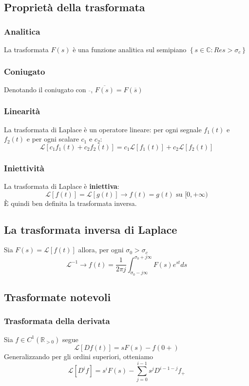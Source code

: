 \documentclass[11pt]{article}
\begin{document}
\subsection{Proprietà della trasformata}
\subsubsection{Analitica}
La trasformata $F(s)$ è una funzione analitica sul semipiano $\left\{s \in \mathbb{C}: Re s > \sigma_c\right\}$
\subsubsection{Coniugato}
Denotando il coniugato con $\overline{ }$, $\overline{F(s)} = F(\overline{s})$
\subsubsection{Linearità}
La trasformata di Laplace è un operatore lineare: per ogni segnale $f_1(t)$ e $f_2(t)$ e per ogni scalare $c_1$ e $c_2$:
\begin{displaymath}
    \mathcal{L}[c_1 f_1 (t) + c_2f_2(t)] = c_1 \mathcal{L}[f_1(t)] + c_2 \mathcal{L}[f_2(t)]
\end{displaymath}
\subsubsection{Iniettività}
La trasformata di Laplace è \textbf{iniettiva}:
\begin{displaymath}
    \mathcal{L}[f(t)] = \mathcal{L}[g(t)] \rightarrow f(t) = g(t) \textrm{ su }[0, +\infty )
\end{displaymath}
È quindi ben definita la trasformata inversa.
\subsection{La trasformata inversa di Laplace}
Sia $F(s) = \mathcal{L}[f(t)]$ allora, per ogni $\sigma_0 > \sigma_c$
\begin{displaymath}
    \mathcal{L}^{-1} \rightarrow f(t) = \frac{1}{2\pi j} \int_{\sigma_0-j\infty}^{\sigma_0+j\infty} F(s) e^{st} ds
\end{displaymath}
\subsection{Trasformate notevoli}
\subsubsection{Trasformata della derivata}
Sia $f \in C^1 (\mathbb{R}_{>0})$ segue
\begin{displaymath}
    \mathcal{L}[Df(t)] = sF(s) - f(0+)
\end{displaymath}
Generalizzando per gli ordini superiori, otteniamo
\begin{displaymath}
    \mathcal{L}[D^i f] = s^i F(s) - \sum_{j=0}^{i-1} s^j D^{i-1-j} f_+
\end{displaymath}
\end{document}
